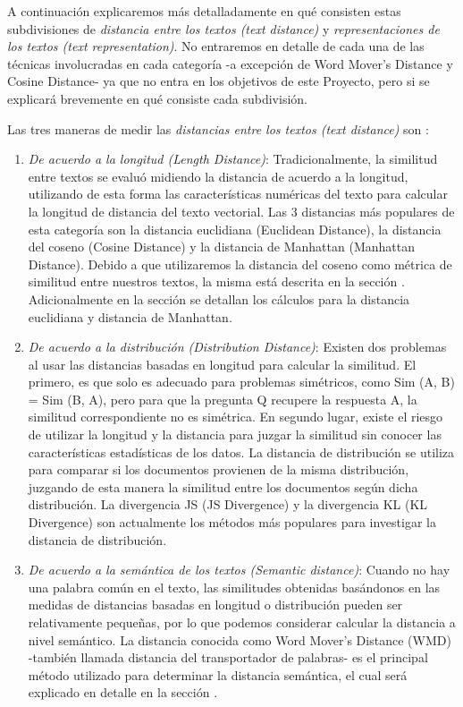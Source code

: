 \documentclass[12pt,a4paper]{article}
\begin{document}
\begin{sloppypar}
A continuación explicaremos más detalladamente en qué consisten estas subdivisiones de \textit{distancia entre los textos (text distance)} y \textit{representaciones de los textos (text representation)}. No entraremos en detalle de cada una de las técnicas involucradas en cada categoría -a excepción de Word Mover’s Distance y Cosine Distance- ya que no entra en los objetivos de este Proyecto, pero si se explicará brevemente en qué consiste cada subdivisión.

Las tres maneras de medir las \textit{distancias entre los textos (text distance)} son \cite{similarity_survey}: 

\begin{enumerate}

\item \textit{De acuerdo a la longitud (Length Distance)}: Tradicionalmente, la similitud entre textos se evaluó midiendo la distancia de acuerdo a la longitud, utilizando de esta forma las características numéricas del texto para calcular la longitud de distancia del texto vectorial. Las 3 distancias más populares de esta categoría son la distancia euclidiana (Euclidean Distance), la distancia del coseno (Cosine Distance) y la distancia de Manhattan (Manhattan Distance). 
Debido a que utilizaremos la distancia del coseno como métrica de similitud entre nuestros textos, la misma está descrita en la sección \textit{}.
Adicionalmente en la sección \textit{} se detallan los cálculos para la distancia euclidiana y distancia de Manhattan.

\item \textit{De acuerdo a la distribución (Distribution Distance)}: Existen dos problemas al usar las distancias basadas en longitud para calcular la similitud. El primero, es que solo es adecuado para problemas simétricos, como Sim (A, B) = Sim (B, A), pero para que la pregunta Q recupere la respuesta A, la similitud correspondiente no es simétrica. En segundo lugar, existe el riesgo de utilizar la longitud y la distancia para juzgar la similitud sin conocer las características estadísticas de los datos\cite{WMD_2}. 
La distancia de distribución se utiliza para comparar si los documentos provienen de la misma distribución, juzgando de esta manera la similitud entre los documentos según dicha distribución. La divergencia JS (JS Divergence) y la divergencia KL (KL Divergence) son actualmente los métodos más populares para investigar la distancia de distribución.

\item \textit{De acuerdo a la semántica de los textos (Semantic distance)}: Cuando no hay una palabra común en el texto, las similitudes obtenidas basándonos en las medidas de distancias basadas en longitud o distribución pueden ser relativamente pequeñas, por lo que podemos considerar calcular la distancia a nivel semántico. La distancia conocida como Word Mover’s Distance (WMD) -también llamada distancia del transportador de palabras- es el principal método utilizado para determinar la distancia semántica\cite{wmd_paper}, el cual será explicado en detalle en la sección \textit{}.


\end{enumerate}
\end{sloppypar}
\end{document}
